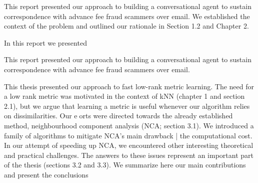 This report presented our approach to building a conversational agent to sustain correspondence with advance fee fraud scammers over email.
We established the context of the problem and outlined our rationale in Section 1.2 and Chapter 2.

In this report we presented

This report presented our approach to building a conversational agent to sustain correspondence with advance fee fraud scammers over email.



This thesis presented our approach to fast low-rank metric learning. The need for
a low rank metric was motivated in the context of kNN (chapter 1 and section 2.1),
but we argue that learning a metric is useful whenever our algorithm relies on
dissimilarities. Our eorts were directed towards the already established method,
neighbourhood component analysis (NCA; section 3.1). We introduced a family
of algorithms to mitigate NCA's main drawback | the computational cost. In
our attempt of speeding up NCA, we encountered other interesting theoretical
and practical challenges. The answers to these issues represent an important part
of the thesis (sections 3.2 and 3.3). We summarize here our main contributions
and present the conclusions